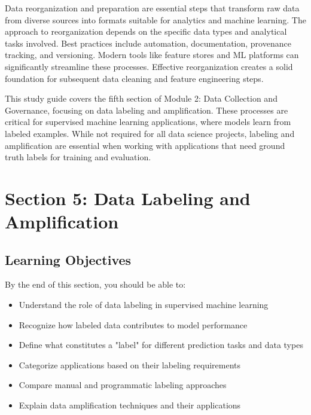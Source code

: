 \documentclass[12pt]{article}
\begin{document}
\begin{tcolorbox}[colback=red!5!white,colframe=red!75!black,title={Key Takeaway}]
Data reorganization and preparation are essential steps that transform raw data from diverse sources into formats suitable for analytics and machine learning. The approach to reorganization depends on the specific data types and analytical tasks involved. Best practices include automation, documentation, provenance tracking, and versioning. Modern tools like feature stores and ML platforms can significantly streamline these processes. Effective reorganization creates a solid foundation for subsequent data cleaning and feature engineering steps.
\end{tcolorbox}

\newpage

\begin{tcolorbox}[colback=blue!5!white,colframe=blue!75!black,title={Section 5: Data Labeling and Amplification}]
This study guide covers the fifth section of Module 2: Data Collection and Governance, focusing on data labeling and amplification. These processes are critical for supervised machine learning applications, where models learn from labeled examples. While not required for all data science projects, labeling and amplification are essential when working with applications that need ground truth labels for training and evaluation.
\end{tcolorbox}

\section{Section 5: Data Labeling and Amplification}

\subsection{Learning Objectives}

By the end of this section, you should be able to:

\begin{itemize}
    \item Understand the role of data labeling in supervised machine learning
    \item Recognize how labeled data contributes to model performance
    \item Define what constitutes a "label" for different prediction tasks and data types
    \item Categorize applications based on their labeling requirements
    \item Compare manual and programmatic labeling approaches
    \item Explain data amplification techniques and their applications
\end{itemize}
\end{document}
